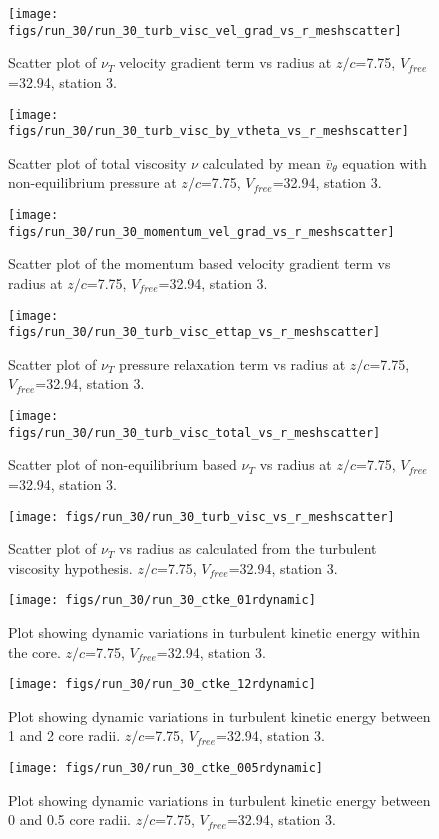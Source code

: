 \begin{figure}[H]
\centering
\texttt{[image: figs/run\_30/run\_30\_turb\_visc\_vel\_grad\_vs\_r\_meshscatter]}
\caption{Scatter plot of $\nu_T$ velocity gradient term vs radius at $z/c$=7.75, $V_{free}$=32.94, station 3.}
\end{figure}


\begin{figure}[H]
\centering
\texttt{[image: figs/run\_30/run\_30\_turb\_visc\_by\_vtheta\_vs\_r\_meshscatter]}
\caption{Scatter plot of total viscosity $\nu$ calculated by mean $\bar{v}_{\theta}$ equation with non-equilibrium pressure at $z/c$=7.75, $V_{free}$=32.94, station 3.}
\end{figure}


\begin{figure}[H]
\centering
\texttt{[image: figs/run\_30/run\_30\_momentum\_vel\_grad\_vs\_r\_meshscatter]}
\caption{Scatter plot of the momentum based velocity gradient term vs radius at $z/c$=7.75, $V_{free}$=32.94, station 3.}
\end{figure}


\begin{figure}[H]
\centering
\texttt{[image: figs/run\_30/run\_30\_turb\_visc\_ettap\_vs\_r\_meshscatter]}
\caption{Scatter plot of $\nu_T$ pressure relaxation term vs radius at $z/c$=7.75, $V_{free}$=32.94, station 3.}
\end{figure}


\begin{figure}[H]
\centering
\texttt{[image: figs/run\_30/run\_30\_turb\_visc\_total\_vs\_r\_meshscatter]}
\caption{Scatter plot of non-equilibrium based $\nu_T$ vs radius at $z/c$=7.75, $V_{free}$=32.94, station 3.}
\end{figure}


\begin{figure}[H]
\centering
\texttt{[image: figs/run\_30/run\_30\_turb\_visc\_vs\_r\_meshscatter]}
\caption{Scatter plot of $\nu_T$ vs radius as calculated from the turbulent viscosity hypothesis. $z/c$=7.75, $V_{free}$=32.94, station 3.}
\end{figure}


\begin{figure}[H]
\centering
\texttt{[image: figs/run\_30/run\_30\_ctke\_01rdynamic]}
\caption{Plot showing dynamic variations in turbulent kinetic energy within the core. $z/c$=7.75, $V_{free}$=32.94, station 3.}
\end{figure}


\begin{figure}[H]
\centering
\texttt{[image: figs/run\_30/run\_30\_ctke\_12rdynamic]}
\caption{Plot showing dynamic variations in turbulent kinetic energy between 1 and 2 core radii. $z/c$=7.75, $V_{free}$=32.94, station 3.}
\end{figure}


\begin{figure}[H]
\centering
\texttt{[image: figs/run\_30/run\_30\_ctke\_005rdynamic]}
\caption{Plot showing dynamic variations in turbulent kinetic energy between 0 and 0.5 core radii. $z/c$=7.75, $V_{free}$=32.94, station 3.}
\end{figure}


